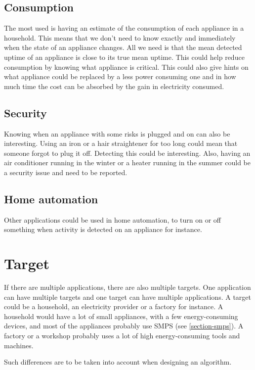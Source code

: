 \subsection{Consumption}
The most used is having an estimate of the consumption of each appliance in a household. This means that we don't need to know exactly and immediately when the state of an appliance changes. All we need is that the mean detected uptime of an appliance is close to its true mean uptime. This could help reduce consumption by knowing what appliance is critical. This could also give hints on what appliance could be replaced by a less power consuming one and in how much time the cost can be absorbed by the gain in electricity consumed.

\subsection{Security}
Knowing when an appliance with some risks is plugged and on can also be interesting. Using an iron or a hair straightener for too long could mean that someone forgot to plug it off. Detecting this could be interesting. Also, having an air conditioner running in the winter or a heater running in the summer could be a security issue and need to be reported.

\subsection{Home automation}
Other applications could be used in home automation, to turn on or off something when activity is detected on an appliance for instance.

\section{Target}\label{section-target}
If there are multiple applications, there are also multiple targets. One application can have multiple targets and one target can have multiple applications. A target could be a household, an electricity provider or a factory for instance. A household would have a lot of small appliances, with a few energy-consuming devices, and most of the appliances probably use SMPS (see \autoref{section-smps}). A factory or a workshop probably uses a lot of high energy-consuming tools and machines.

Such differences are to be taken into account when designing an algorithm.






